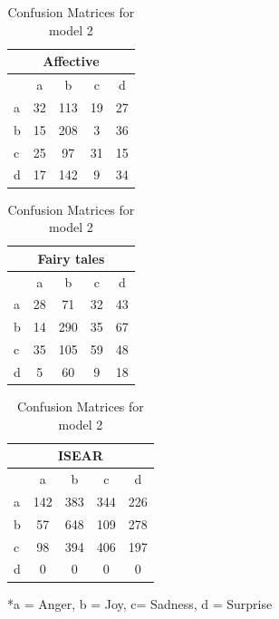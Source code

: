 \documentclass[11pt]{article}
\begin{document}
\begin{table}[hbt]
            \footnotesize
                \begin{tabular}[t]{|l|c|c|c|c|}
                    \hline
                    \multicolumn{5}{|c|}{{Affective}} \\    
                    \hline
                    &a&b&c&d\\ \hline
                    a&32&113&19&27 \\ \hline
                    b&15&208&3&36\\ \hline
                    c&25&97&31&15 \\ \hline   
                    d&17&142&9&34\\ \hline
                \end{tabular}
                \hfill
                \begin{tabular}[t]{|l|c|c|c|c|}
                    \hline
                    \multicolumn{5}{|c|}{{Fairy tales}} \\    
                    \hline
                    &a&b&c&d\\ \hline
                    a&28&71&32&43 \\ \hline
                    b&14&290&35&67\\ \hline
                    c&35&105&59&48 \\ \hline   
                    d&5&60&9&18\\ \hline
                \end{tabular}
                \hfill
                \begin{tabular}[t]{|l|c|c|c|c|}
                    \hline
                    \multicolumn{5}{|c|}{{ISEAR}} \\    
                    \hline
                    &a&b&c&d\\ \hline
                    a&142&383&344&226 \\ \hline
                    b&57&648&109&278\\ \hline
                    c&98&394&406&197 \\ \hline   
                    d&0&0&0&0\\ \hline
                \end{tabular}
                \caption{Confusion Matrices for model 2}
                \label{Confusion Matrices for model 2}
                *a = Anger, b = Joy, c= Sadness, d = Surprise
            \end{table}
\end{document}
